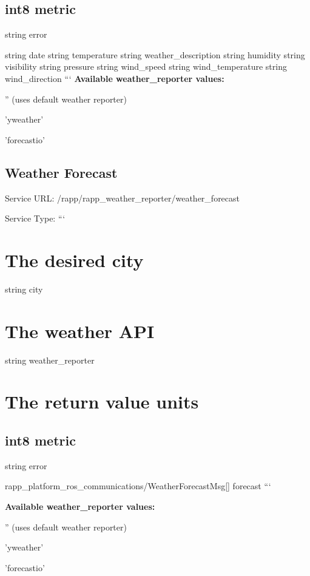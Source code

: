 \subsection*{int8 metric }

string error

string date string temperature string weather\-\_\-description string humidity string visibility string pressure string wind\-\_\-speed string wind\-\_\-temperature string wind\-\_\-direction ``` {\bfseries Available weather\-\_\-reporter values\-:}
\begin{DoxyItemize}
\item '' (uses default weather reporter)
\item 'yweather'
\item 'forecastio'
\end{DoxyItemize}

\subsection*{Weather Forecast}

Service U\-R\-L\-: {\ttfamily /rapp/rapp\-\_\-weather\-\_\-reporter/weather\-\_\-forecast}

Service Type\-: ``` \section*{The desired city}

string city \section*{The weather A\-P\-I}

string weather\-\_\-reporter \section*{The return value units}

\subsection*{int8 metric }

string error

rapp\-\_\-platform\-\_\-ros\-\_\-communications/\-Weather\-Forecast\-Msg\mbox{[}\mbox{]} forecast ```

{\bfseries Available weather\-\_\-reporter values\-:}
\begin{DoxyItemize}
\item '' (uses default weather reporter)
\item 'yweather'
\item 'forecastio'
\end{DoxyItemize}

